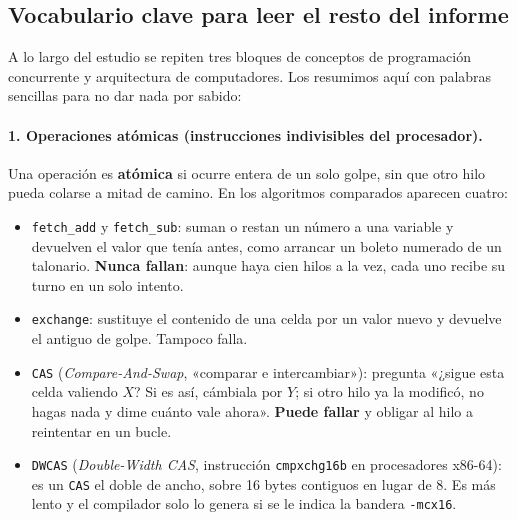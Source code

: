 \documentclass[11pt,a4paper]{article}
\begin{document}
\subsection{Vocabulario clave para leer el resto del informe}
A lo largo del estudio se repiten tres bloques de conceptos de programación concurrente y arquitectura de computadores. Los resumimos aquí con palabras sencillas para no dar nada por sabido:

\paragraph{1. Operaciones atómicas (instrucciones indivisibles del procesador).}
Una operación es \textbf{atómica} si ocurre entera de un solo golpe, sin que otro hilo pueda colarse a mitad de camino. En los algoritmos comparados aparecen cuatro:
\begin{itemize}
  \item \texttt{fetch\_add} y \texttt{fetch\_sub}: suman o restan un número a una variable y devuelven el valor que tenía antes, como arrancar un boleto numerado de un talonario. \textbf{Nunca fallan}: aunque haya cien hilos a la vez, cada uno recibe su turno en un solo intento.
  \item \texttt{exchange}: sustituye el contenido de una celda por un valor nuevo y devuelve el antiguo de golpe. Tampoco falla.
  \item \texttt{CAS} (\emph{Compare-And-Swap}, «comparar e intercambiar»): pregunta «¿sigue esta celda valiendo $X$? Si es así, cámbiala por $Y$; si otro hilo ya la modificó, no hagas nada y dime cuánto vale ahora». \textbf{Puede fallar} y obligar al hilo a reintentar en un bucle.
  \item \texttt{DWCAS} (\emph{Double-Width CAS}, instrucción \texttt{cmpxchg16b} en procesadores x86-64): es un \texttt{CAS} el doble de ancho, sobre 16 bytes contiguos en lugar de 8. Es más lento y el compilador solo lo genera si se le indica la bandera \texttt{-mcx16}.
\end{itemize}
\end{document}

